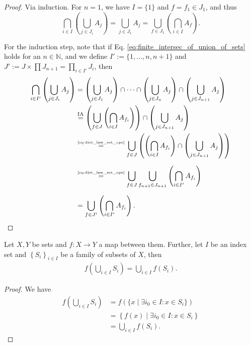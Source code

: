 \begin{proof}
	Via induction. For $n = 1$, we have $I = \{1\}$ and $f = f_1\in J_1$, and thus
	$$\bigcap_{i\in I}\left(\bigcup_{j\in J_i}A_j\right) = \bigcup_{j\in J_1} A_j = \bigcup_{f\in J_1}\left(\bigcap_{i\in I}A_{f}\right).$$
	
	For the induction step, note that if Eq. \eqref{eq:finite_intersec_of_union_of_sets} holds for an $n\in\mathbb N$, and we define $I' := \{1, \dots, n, n+1\}$ and $J' := J\times\prod J_{n+1} = \prod_{i\in I'}J_i$, then
	\begin{align*}
		\bigcap_{i\in I'}\left(\bigcup_{j\in J_i}A_j\right) 
		&= \left( \bigcup_{j\in J_1}A_j \right) \cap \dots\cap \left(\bigcup_{j\in J_n}A_j\right)\cap \left(\bigcup_{j\in J_{n+1}}A_j\right) 
		\\ &\overset{\small\text{IA}}{=} \left(\bigcup_{f\in J}\left(\bigcap_{i\in I}A_{f_i}\right)\right) \cap \left(\bigcup_{j\in J_{n+1}}A_j\right) 
		\\ &\overset{\tiny\eqref{eq:dist_law_set_ops}}{=} \bigcup_{f\in J}\left(\left( \bigcap_{i\in I}A_{f_i}\right) \cap \left( \bigcup_{j\in J_{n+1}}A_j \right)\right)
		\\[6pt] &\overset{\tiny\eqref{eq:dist_law_set_ops}}{=} \bigcup_{f\in J}\bigcup_{f_{n+1}\in J_{n+1}} \left( \bigcap_{i\in I'}A_{f_i}\right)
		\\[6pt] &= \bigcup_{f\in J'}\left( \bigcap_{i\in I'}A_{f_i}\right).
	\end{align*}
\end{proof}

\begin{theorem}\label{thrm:set_theory_unions_intersects_images}
	Let $X, Y$ be sets and $f: X\to Y$ a map between them. Further, let $I$ be an index set and $\left\{S_i\right\}_{i\in I}$ be a family of subsets of $X$, then \cite{1132766}
	\begin{align}\label{eq:set_theory_unions_images}
		f\left(\bigcup_{i\in I}S_i\right) = \bigcup_{i\in I}f(S_i).
	\end{align}
\end{theorem}

\begin{proof}
	We have
	\begin{align*} 
	f\left(\bigcup_{i\in I}S_i\right) &= f\left( \{x\mid \exists i_0\in I: x\in S_i\} \right) 
	\\ &= \left\{ f(x) \mid \exists i_0\in I: x\in S_i \right\} 
	\\ &= \bigcup_{i\in I}f(S_i).
	\end{align*} 
\end{proof}

